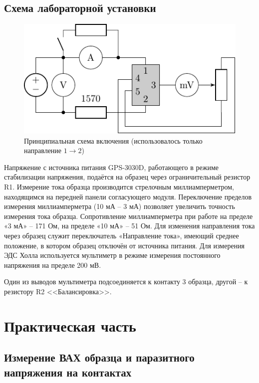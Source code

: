 \subsection{Схема лабораторной установки}

\begin{figure}[h!]
	\centering
	\includegraphics[scale=1.5]{ris/chem.pdf}
	\caption{Принципиальная схема включения (использовалось только направление $1\to2$)}
	\label{fig:figure2}
\end{figure}

Напряжение с источника питания GPS-3030D, работающего в режиме стабилизации напряжения, подаётся на образец через
ограничительный резистор R1. Измерение тока образца производится стрелочным миллиамперметром, находящимся на передней
панели согласующего модуля. Переключение пределов измерения миллиамперметра (10 мА – 3 мА) позволяет увеличить точность
измерения тока образца. Сопротивление миллиамперметра при работе на пределе «3 мА» – 171 Ом, на пределе «10 мА» – 51 Ом.
Для изменения направления тока через образец служит переключатель «Направление тока», имеющий среднее положение, в
котором образец отключён от источника питания.
Для измерения ЭДС Холла используется мультиметр в режиме измерения постоянного напряжения на пределе 200 мВ. 

Один из выводов мультиметра подсоединяется к контакту 3 образца, другой – к резистору R2 <<Балансировка>>.


\section{Практическая часть}
\subsection{Измерение ВАХ образца и паразитного напряжения на контактах}

